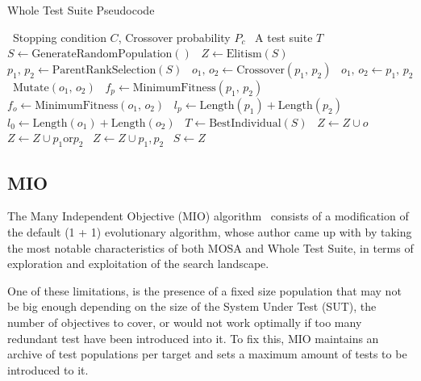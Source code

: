 \documentclass[%
  chapterprefix=false,%
  open=right,%
  twoside=true,%
  paper=a4,%
  logofile={Figures/logo.png},%
  thesistype=master,%
  UKenglish,%
]{se2thesis}
\begin{document}
\begin{algorithm}[h!]
  \centering
  \caption{Whole Test Suite Pseudocode}\label{alg:WTSpseudo}
  \begin{algorithmic}[1]
    \Require~Stopping condition \(C\), Crossover probability \(P_c\)
    \Ensure~A test suite \(T\)
    \State~\(S \gets \text{GenerateRandomPopulation}()\)
      \State~\(Z \gets \text{Elitism}(S)\)
        \State~\(p_1,\, p_2 \gets \text{ParentRankSelection}(S)\)
          \State~\(o_1,\, o_2 \gets \text{Crossover}(p_1,\, p_2)\)
        \Else\@
          \State~\(o_1,\, o_2 \gets p_1,\, p_2\)
        \EndIf\@
        \State~\(\text{Mutate}(o_1,\, o_2)\)
        \State~\(f_p \gets \text{MinimumFitness}(p_1,\, p_2)\)
        \State~\(f_o \gets \text{MinimumFitness}(o_1,\, o_2)\)
        \State~\(l_p \gets \text{Length}(p_1) + \text{Length}(p_2)\)
        \State~\(l_0 \gets \text{Length}(o_1) + \text{Length}(o_2)\)
        \State~\(T \gets \text{BestIndividual}(S)\)
              \State~\(Z \gets Z \cup {o}\)
            \Else\@
              \State~\(Z \gets Z \cup {p_1 \text{or} p_2}\)
            \EndIf\@
          \EndFor\@
        \Else\@
          \State~\(Z \gets Z \cup {p_1, p_2}\)
        \EndIf\@
      \EndWhile\@
      \State~\(S \gets Z\)
    \EndWhile\@
  \end{algorithmic}
\end{algorithm}

\newpage

\subsection{MIO}

The Many Independent Objective (MIO) algorithm~\cite{DBLP:journals/infsof/Arcuri18} consists of a modification of the default (1 + 1) evolutionary algorithm, whose author came up with by taking the most notable characteristics of both MOSA and Whole Test Suite, in terms of exploration and exploitation of the search landscape.

One of these limitations, is the presence of a fixed size population that may not be big enough depending on the size of the System Under Test (SUT), the number of objectives to cover, or would not work optimally if too many redundant test have been introduced into it.
To fix this, MIO maintains an archive of test populations per target and sets a maximum amount of tests to be introduced to it.
\end{document}
